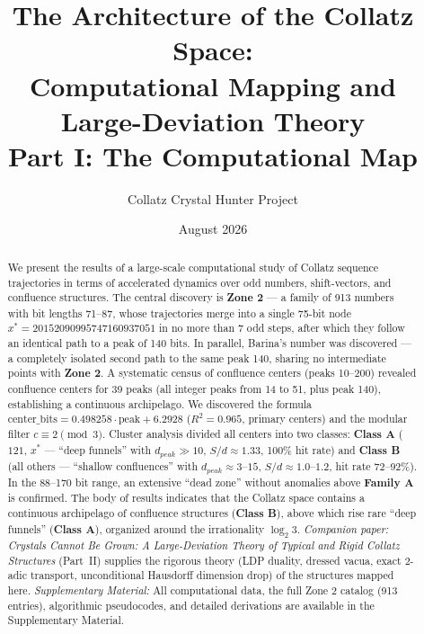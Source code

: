 \documentclass[12pt,a4paper]{article}
\title{The Architecture of the Collatz Space:\\
Computational Mapping and Large-Deviation Theory\\
\large Part I: The Computational Map}
\author{Collatz Crystal Hunter Project}
\date{August 2026}
\theoremstyle{remark}
\begin{document}
\maketitle
\begin{abstract}
We present the results of a large-scale computational study of Collatz sequence
trajectories in terms of accelerated dynamics over odd numbers, shift-vectors,
and confluence structures. The central discovery is \textbf{Zone 2} --- a family
of 913 numbers with bit lengths 71--87, whose trajectories merge into a single
75-bit node $x^* = 20152090995747160937051$ in no more than 7 odd steps, after
which they follow an identical path to a peak of 140 bits. In parallel, Barina's
number was discovered --- a completely isolated second path to the same peak 140,
sharing no intermediate points with \textbf{Zone 2}. A systematic census of
confluence centers (peaks 10--200) revealed confluence centers for 39 peaks (all
integer peaks from 14 to 51, plus peak 140), establishing a continuous
archipelago. We discovered the formula
$\mathrm{center\_bits} = 0.498258 \cdot \mathrm{peak} + 6.2928$ ($R^2 = 0.965$,
primary centers) and the modular filter $c \equiv 2 \pmod 3$. Cluster analysis
divided all centers into two classes: \textbf{Class A} ($121$, $x^*$ --- ``deep
funnels'' with $d_{peak} \gg 10$, $S/d \approx 1.33$, 100\% hit rate) and
\textbf{Class B} (all others --- ``shallow confluences'' with
$d_{peak} \approx 3\text{--}15$, $S/d \approx 1.0\text{--}1.2$, hit rate
72--92\%). In the 88--170 bit range, an extensive ``dead zone'' without
anomalies above \textbf{Family A} is confirmed. The body of results indicates
that the Collatz space contains a continuous archipelago of confluence
structures (\textbf{Class B}), above which rise rare ``deep funnels''
(\textbf{Class A}), organized around the irrationality $\log_2 3$.
\smallskip
\noindent\textit{Companion paper:} \textit{Crystals Cannot Be Grown: A
Large-Deviation Theory of Typical and Rigid Collatz Structures} (Part~II)
supplies the rigorous theory (LDP duality, dressed vacua, exact $2$-adic
transport, unconditional Hausdorff dimension drop) of the structures mapped here.
\smallskip
\noindent\textit{Supplementary Material:} All computational data, the full Zone 2
catalog (913 entries), algorithmic pseudocodes, and detailed derivations are
available in the Supplementary Material.
\end{abstract}
\end{document}
